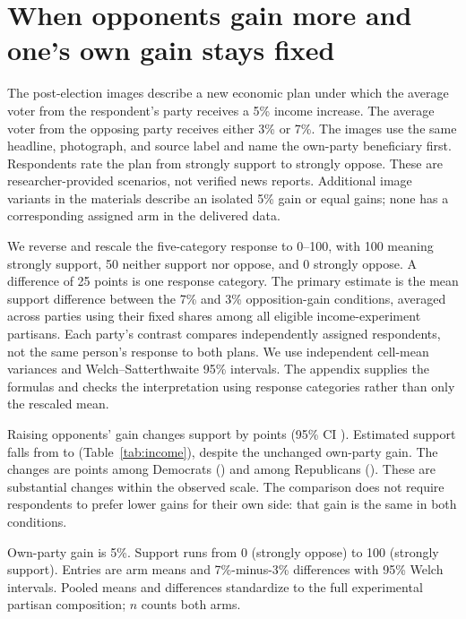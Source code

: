 \documentclass[11pt]{article}
\begin{document}
\section{When opponents gain more and one's own gain stays fixed}
The post-election images describe a new economic plan under which the average voter from the respondent's party receives a 5\% income increase. The average voter from the opposing party receives either 3\% or 7\%. The images use the same headline, photograph, and source label and name the own-party beneficiary first. Respondents rate the plan from strongly support to strongly oppose. These are researcher-provided scenarios, not verified news reports. Additional image variants in the materials describe an isolated 5\% gain or equal gains; none has a corresponding assigned arm in the delivered data.

We reverse and rescale the five-category response to 0--100, with 100 meaning strongly support, 50 neither support nor oppose, and 0 strongly oppose. A difference of 25 points is one response category. The primary estimate is the mean support difference between the 7\% and 3\% opposition-gain conditions, averaged across parties using their fixed shares among all eligible income-experiment partisans. Each party's contrast compares independently assigned respondents, not the same person's response to both plans. We use independent cell-mean variances and Welch--Satterthwaite 95\% intervals. The appendix supplies the formulas and checks the interpretation using response categories rather than only the rescaled mean.

Raising opponents' gain changes support by \IncomePoolEstimate{} points (95\% CI \IncomePoolCI{}). Estimated support falls from \IncomePoolBaseline{} to \IncomePoolTreated{} (Table~\ref{tab:income}), despite the unchanged own-party gain. The changes are \IncomeDemEstimate{} points among Democrats (\IncomeDemCI{}) and \IncomeRepEstimate{} among Republicans (\IncomeRepCI{}). These are substantial changes within the observed scale. The comparison does not require respondents to prefer lower gains for their own side: that gain is the same in both conditions.

\begin{table}[!htbp]
\centering\small
\caption{Income experiment: policy support when opponents gain more.}
\label{tab:income}
\begin{minipage}{\linewidth}\footnotesize
Own-party gain is 5\%. Support runs from 0 (strongly oppose) to 100 (strongly support). Entries are arm means and 7\%-minus-3\% differences with 95\% Welch intervals. Pooled means and differences standardize to the full experimental partisan composition; $n$ counts both arms.
\end{minipage}
\end{table}
\end{document}
